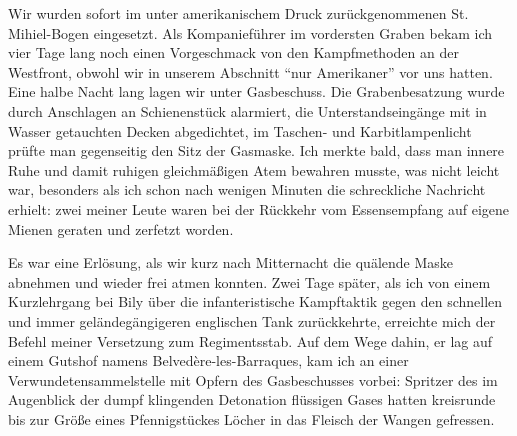 \documentclass[a5paper,pagesize,10pt,twoside=true]{scrbook}
\renewcommand{\marginpar}[2][]{}
\begin{document}
\marginpar{381}
Wir wurden sofort im unter amerikanischem Druck zurückgenommenen St. Mihiel-Bogen eingesetzt. Als Kompanieführer im vordersten Graben bekam ich vier Tage lang noch einen Vorgeschmack von den Kampfmethoden an der Westfront, obwohl wir in unserem Abschnitt \enquote{nur Amerikaner} vor uns hatten. Eine halbe Nacht lang lagen wir unter Gasbeschuss. Die Grabenbesatzung wurde durch Anschlagen an Schienenstück alarmiert, die Unterstandseingänge mit in Wasser getauchten Decken abgedichtet, im Taschen- und Karbitlampenlicht prüfte man gegenseitig den Sitz der Gasmaske. Ich merkte bald, dass man innere Ruhe und damit ruhigen gleichmäßigen Atem bewahren musste, was nicht leicht war, besonders als ich schon nach wenigen Minuten die schreckliche Nachricht erhielt: zwei meiner Leute waren bei der Rückkehr vom Essensempfang auf eigene Mienen geraten und zerfetzt worden.

Es war eine Erlösung, als wir kurz nach Mitternacht die quälende Maske abnehmen und wieder frei atmen konnten. Zwei Tage später, als ich von einem Kurzlehrgang bei Bily über die infanteristische Kampftaktik gegen den schnellen und immer geländegängigeren englischen Tank zurückkehrte, erreichte mich der Befehl meiner Versetzung zum Regimentsstab. Auf dem Wege dahin, er lag auf einem Gutshof namens Belvedère-les-Barraques, kam ich an einer Verwundetensammelstelle mit Opfern des Gasbeschusses vorbei: Spritzer des im Augenblick der dumpf klingenden Detonation flüssigen Gases hatten kreisrunde bis zur Größe eines Pfennigstückes Löcher in das Fleisch der Wangen gefressen.
\end{document}
